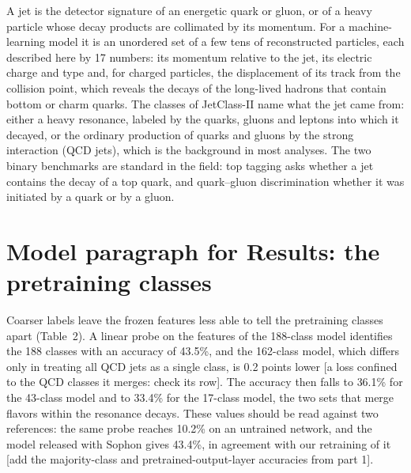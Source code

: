 \documentclass[11pt,a4paper]{article}
\newcommand{\bn}[1]{\textcolor{blue!70!black}{#1}}
\newcommand{\chk}[1]{\textcolor{red!70!black}{#1}}
\begin{document}
A jet is the detector signature of an energetic quark or gluon, or of a heavy particle whose
decay products are collimated by its momentum.
For a machine-learning model it is an unordered set of a few tens of reconstructed particles, each
described here by 17 numbers: its momentum relative to the jet, its electric charge and type and,
for charged particles, the displacement of its track from the collision point, which reveals the
decays of the long-lived hadrons that contain bottom or charm quarks.
The classes of JetClass-II name what the jet came from: either a heavy resonance, labeled by the
quarks, gluons and leptons into which it decayed, or the ordinary production of quarks and gluons
by the strong interaction (QCD jets), which is the background in most analyses.
The two binary benchmarks are standard in the field: top tagging asks whether a jet contains the
decay of a top quark, and quark--gluon discrimination whether it was initiated by a quark or by a
gluon.

\section*{Model paragraph for Results: the pretraining classes}

Coarser labels leave the frozen features less able to tell the pretraining classes apart (Table~2).
A linear probe on the features of the 188-class model identifies the 188 classes with an accuracy
of \bn{43.5\%}, and the 162-class model, which differs only in treating all QCD jets as a single
class, is \bn{0.2} points lower \chk{[a loss confined to the QCD classes it merges: check its row]}.
The accuracy then falls to \bn{36.1\%} for the 43-class model and to \bn{33.4\%} for the 17-class
model, the two sets that merge flavors within the resonance decays.
These values should be read against two references: the same probe reaches \bn{10.2\%} on an
untrained network, and the model released with Sophon gives \bn{43.4\%}, in agreement with our
retraining of it \chk{[add the majority-class and pretrained-output-layer accuracies from part 1]}.
\end{document}
